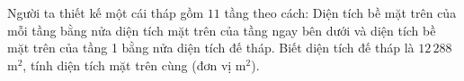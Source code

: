 \begin{ex}%
	Người ta thiết kế một cái tháp gồm $11$ tầng theo cách: Diện tích bề mặt trên của mỗi tầng bằng nửa diện tích mặt trên của tầng ngay bên dưới và diện tích bề mặt trên của tầng 1 bằng nửa diện tích đế tháp. Biết diện tích đế tháp là $12\,288$ m$^2$, tính diện tích mặt trên cùng (đơn vị m$^2$).
\end{ex}
